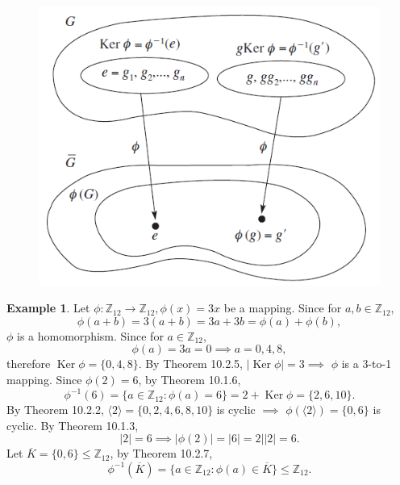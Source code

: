 \documentclass{article}
\theoremstyle{definition}
\newtheorem{example}{Example}[section]
\DeclareMathOperator{\Ker}{Ker}
\begin{document}
    \begin{figure}[!htbp]
        \centering
        \includegraphics[width=0.6\linewidth]{figures/fig10.1.png}
        \caption{}
        \label{fig10.1}
    \end{figure}
    
    \begin{example}
        Let $\phi:\mathbb{Z}_{12}\to\mathbb{Z}_{12},\phi(x)=3x$ be a mapping. Since for $a,b\in\mathbb{Z}_{12}$,
        \begin{equation*}
            \phi(a+b) = 3(a+b) = 3a+3b = \phi(a)+\phi(b),
        \end{equation*}
        $\phi$ is a homomorphism. Since for $a\in\mathbb{Z}_{12}$,
        \begin{equation*}
            \phi(a)=3a=0 \implies a=0,4,8,
        \end{equation*}
        therefore $\Ker\phi=\{0,4,8\}$. By Theorem 10.2.5, $ |\Ker\phi|=3 \implies$ $\phi$ is a 3-to-1 mapping. Since $\phi(2)=6$, by Theorem 10.1.6,
        \begin{equation*}
            \phi^{-1}(6)=\{a\in\mathbb{Z}_{12}:\phi(a)=6\}=2+\Ker\phi=\{2,6,10\}.
        \end{equation*}
        By Theorem 10.2.2, $\langle2\rangle=\{0,2,4,6,8,10\}$ is cyclic $\implies$ $\phi(\langle2\rangle)=\{0,6\}$ is cyclic. By Theorem 10.1.3,
        \begin{equation*}
            |2|=6 \implies |\phi(2)|=|6|=2||2|=6.
        \end{equation*}
        Let $\overline{K}=\{0,6\} \leq \mathbb{Z}_{12}$, by Theorem 10.2.7,
        \begin{equation*}
            \phi^{-1}(\overline{K}) = \{a\in\mathbb{Z}_{12}:\phi(a)\in\overline{K}\} \leq \mathbb{Z}_{12}.
        \end{equation*}
    \end{example}
    
\end{document}
